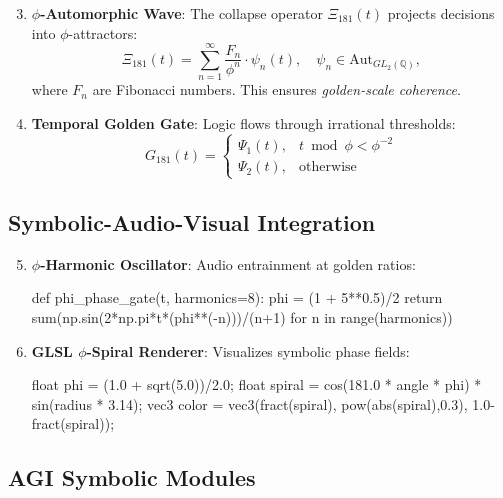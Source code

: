 \documentclass[12pt]{article}
\begin{document}
\begin{center}
\begin{enumerate}
    \setcounter{enumi}{2}
    \item \textbf{$\phi$-Automorphic Wave}:
    The collapse operator $\Xi_{181}(t)$ projects decisions into $\phi$-attractors:
    \[
    \Xi_{181}(t) = \sum_{n=1}^{\infty} \frac{F_n}{\phi^n} \cdot \psi_n(t), \quad \psi_n \in \text{Aut}_{GL_2(\mathbb{Q})},
    \]
    where $F_n$ are Fibonacci numbers. This ensures \textit{golden-scale coherence}.

    \item \textbf{Temporal Golden Gate}:
    Logic flows through irrational thresholds:
    \[
    G_{181}(t) = \begin{cases}
    \Psi_1(t), & t \bmod \phi < \phi^{-2} \\
    \Psi_2(t), & \text{otherwise}
    \end{cases}
    \]
\end{enumerate}

\subsection{Symbolic-Audio-Visual Integration}
\label{subsec:audiovisual}

\begin{enumerate}
    \setcounter{enumi}{4}
    \item \textbf{$\phi$-Harmonic Oscillator}:
    Audio entrainment at golden ratios:
    \begin{python}
def phi_phase_gate(t, harmonics=8):
    phi = (1 + 5**0.5)/2
    return sum(np.sin(2*np.pi*t*(phi**(-n)))/(n+1) for n in range(harmonics))
    \end{python}

    \item \textbf{GLSL $\phi$-Spiral Renderer}:
    Visualizes symbolic phase fields:
    \begin{glsl}
float phi = (1.0 + sqrt(5.0))/2.0;
float spiral = cos(181.0 * angle * phi) * sin(radius * 3.14);
vec3 color = vec3(fract(spiral), pow(abs(spiral),0.3), 1.0-fract(spiral));
    \end{glsl}
\end{enumerate}

\subsection{AGI Symbolic Modules}
\label{subsec:modules}


\end{center}
\end{document}
